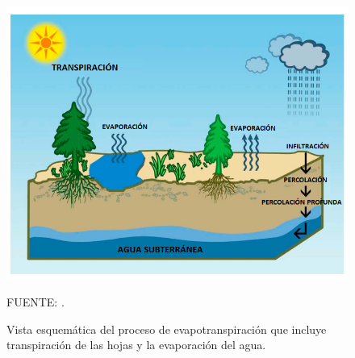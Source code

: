\begin{figure}[ht!]
\centering
	\includegraphics[scale=0.75]{Images/wang02.png}
	\caption{Vista esquemática del proceso de evapotranspiración que incluye transpiración de las hojas y la evaporación del agua.}
	{\raggedright FUENTE: \citet{wang2012review}.	 \par}

	\label{fig:wang02}
\end{figure}